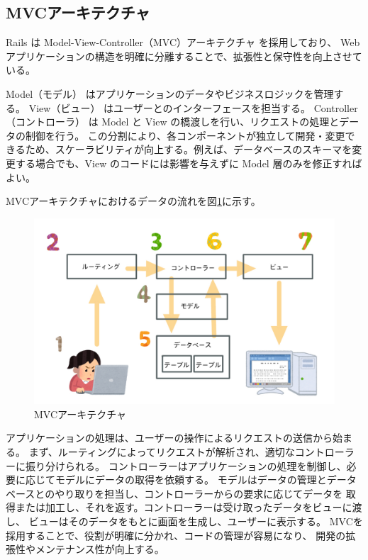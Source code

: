 \documentclass[dvipdfmx,fleqn,article]{jlreq}
\begin{document}
\subsection{MVCアーキテクチャ}
Rails は Model-View-Controller（MVC）アーキテクチャ を採用しており、
Webアプリケーションの構造を明確に分離することで、拡張性と保守性を向上させている。

Model（モデル） はアプリケーションのデータやビジネスロジックを管理する。
View（ビュー） はユーザーとのインターフェースを担当する。
Controller（コントローラ） は Model と View の橋渡しを行い、リクエストの処理とデータの制御を行う。
この分割により、各コンポーネントが独立して開発・変更できるため、スケーラビリティが向上する。例えば、データベースのスキーマを変更する場合でも、View のコードには影響を与えずに Model 層のみを修正すればよい。


MVCアーキテクチャにおけるデータの流れを図\ref{fig:MVC}に示す。

\begin{figure}[H]
    \centering
    \includegraphics[width=1\textwidth]{figures/MVC.png}
    \caption{MVCアーキテクチャ}
    \label{fig:MVC}
\end{figure}

アプリケーションの処理は、ユーザーの操作によるリクエストの送信から始まる。
まず、ルーティングによってリクエストが解析され、適切なコントローラーに振り分けられる。
コントローラーはアプリケーションの処理を制御し、必要に応じてモデルにデータの取得を依頼する。
モデルはデータの管理とデータベースとのやり取りを担当し、コントローラーからの要求に応じてデータを
取得または加工し、それを返す。コントローラーは受け取ったデータをビューに渡し、
ビューはそのデータをもとに画面を生成し、ユーザーに表示する。
MVCを採用することで、役割が明確に分かれ、コードの管理が容易になり、
開発の拡張性やメンテナンス性が向上する。
\end{document}
